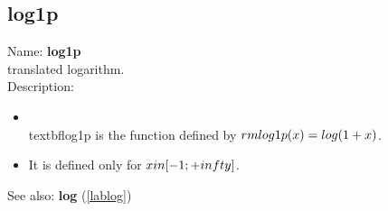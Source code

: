 \subsection{log1p}
\label{lablog1p}
\noindent Name: \textbf{log1p}\\
translated logarithm.\\
\noindent Description: \begin{itemize}

\item \\textbf{log1p} is the function defined by ${\\rm log1p}(x) = \\log(1+x)$.\n
\item It is defined only for $x \\in [-1; +\\infty]$.\n\end{itemize}
See also: \textbf{log} (\ref{lablog})
